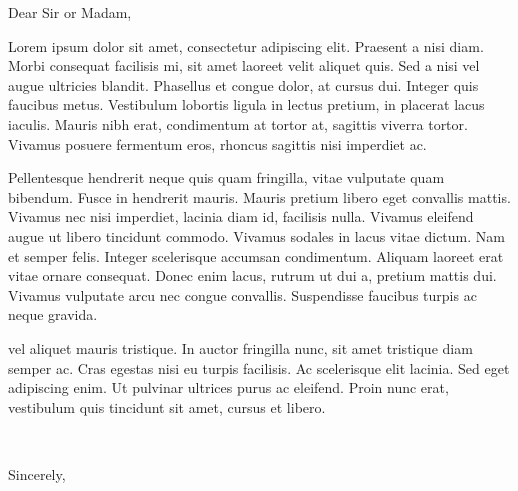 \documentclass[11pt, a4paper]{letter} %
\begin{document}

\begin{letter}{}


\opening{Dear Sir or Madam,}

Lorem ipsum dolor sit amet, consectetur adipiscing elit. Praesent a nisi diam. Morbi consequat facilisis mi, sit amet laoreet velit aliquet quis. Sed a nisi vel augue ultricies blandit. Phasellus et congue dolor, at cursus dui. Integer quis faucibus metus. Vestibulum lobortis ligula in lectus pretium, in placerat lacus iaculis. Mauris nibh erat, condimentum at tortor at, sagittis viverra tortor. Vivamus posuere fermentum eros, rhoncus sagittis nisi imperdiet ac.

Pellentesque hendrerit neque quis quam fringilla, vitae vulputate quam bibendum. Fusce in hendrerit mauris. Mauris pretium libero eget convallis mattis. Vivamus nec nisi imperdiet, lacinia diam id, facilisis nulla. Vivamus eleifend augue ut libero tincidunt commodo. Vivamus sodales in lacus vitae dictum. Nam et semper felis. Integer scelerisque accumsan condimentum. Aliquam laoreet erat vitae ornare consequat. Donec enim lacus, rutrum ut dui a, pretium mattis dui. Vivamus vulputate arcu nec congue convallis. Suspendisse faucibus turpis ac neque gravida.

vel aliquet mauris tristique. In auctor fringilla nunc, sit amet tristique diam semper ac. Cras egestas nisi eu turpis facilisis. Ac scelerisque elit lacinia. Sed eget adipiscing enim. Ut pulvinar ultrices purus ac eleifend. Proin nunc erat, vestibulum quis tincidunt sit amet, cursus et libero. 

~~\\ \vspace{0.3em}

\closing{Sincerely,}




\end{letter}
\end{document}
